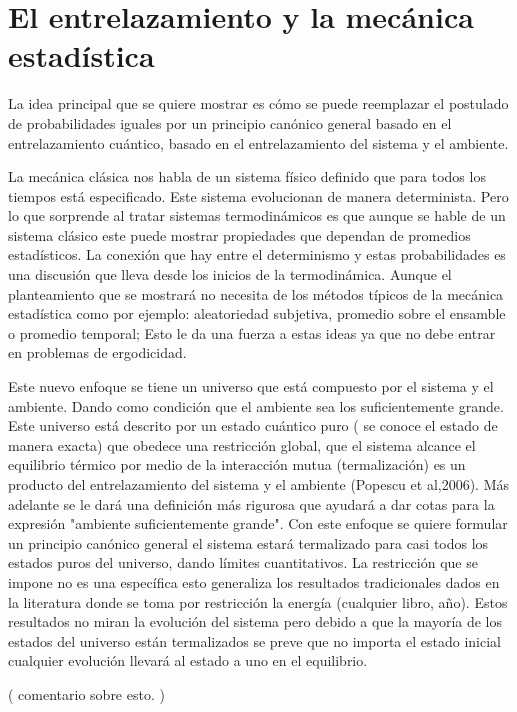 \chapter{El entrelazamiento y la mecánica estadística}

La idea principal que se quiere mostrar es cómo se puede reemplazar el postulado de probabilidades iguales por un principio canónico general basado en el entrelazamiento cuántico, basado en el entrelazamiento del sistema y el ambiente.

La mecánica clásica nos habla de un sistema físico definido que para todos los tiempos está especificado. Este sistema evolucionan de manera determinista. Pero lo que sorprende al tratar sistemas termodinámicos es que aunque se hable de un sistema clásico este puede mostrar propiedades que dependan de promedios estadísticos. La conexión que hay entre el determinismo y estas probabilidades es una discusión que lleva desde los inicios de la termodinámica. Aunque el planteamiento que se mostrará no necesita de los métodos típicos de la mecánica estadística como por ejemplo: aleatoriedad subjetiva, promedio sobre el ensamble o promedio temporal; Esto le da una fuerza a estas ideas ya que no debe entrar en problemas de ergodicidad. 

Este nuevo enfoque se tiene un universo que está compuesto por el sistema y el ambiente. Dando como condición que el ambiente sea los suficientemente grande. Este universo está descrito por un estado cuántico puro ( se conoce el estado de manera exacta) que obedece una restricción global, que el sistema alcance el equilibrio térmico por medio de la interacción mutua (termalización) es un producto del entrelazamiento del sistema y el ambiente (Popescu et al,2006). Más adelante se le dará una definición más rigurosa que ayudará a dar cotas para la expresión "ambiente suficientemente grande". Con este enfoque se quiere formular un principio canónico general  el sistema estará termalizado para casi todos los estados puros del universo, dando límites cuantitativos. La restricción que se impone no es una específica esto generaliza los resultados tradicionales dados en la literatura donde se toma por restricción la energía (cualquier libro, año).
Estos resultados no miran la evolución del sistema pero debido a que la mayoría de los estados del universo están termalizados se preve que no importa el estado inicial cualquier evolución llevará al estado a uno en el equilibrio.

(
comentario sobre esto.
)

